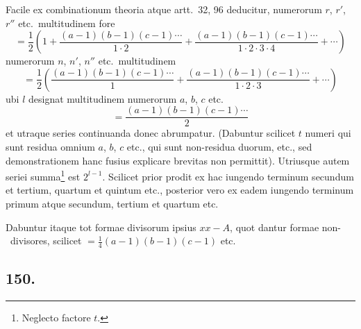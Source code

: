 \documentclass[12pt,a4paper]{article}
\theoremstyle{plain}
\theoremstyle{definition}
\theoremstyle{remark}
\begin{document}
Facile ex combinationum theoria atque artt.~32, 96 deducitur, numerorum
$r$, $r'$, $r''$ etc.\ multitudinem fore
\[
= \frac{1}{2}(1 + \frac{(a-1)(b-1)(c-1)\cdots}{1\cdot 2} + \frac{(a-1)(b-1)(c-1)\cdots}{1\cdot 2\cdot 3\cdot 4} + \cdots)
\]
numerorum $n$, $n'$, $n''$ etc.\ multitudinem
\[
= \frac{1}{2}(\frac{(a-1)(b-1)(c-1)\cdots}{1} + \frac{(a-1)(b-1)(c-1)\cdots}{1\cdot 2\cdot 3} + \cdots)
\]
ubi $l$ designat multitudinem numerorum $a$, $b$, $c$ etc.
\[
= \frac{(a-1)(b-1)(c-1)\cdots}{2}
\]
et utraque series continuanda donec abrumpatur. (Dabuntur scilicet $t$ numeri
qui sunt residua omnium $a$, $b$, $c$ etc., qui sunt non-residua duorum, etc.,
sed demonstrationem hanc fusius explicare brevitas non permittit). Utriusque
autem seriei summa\footnote{Neglecto factore $t$.} est $2^{l-1}$. Scilicet prior prodit ex hac
iungendo terminum secundum et tertium, quartum et quintum etc., posterior vero
ex eadem iungendo terminum primum atque secundum, tertium et quartum etc.

Dabuntur itaque tot formae divisorum ipsius $xx - A$, quot dantur formae non-\ divisores, scilicet $= \frac{1}{4}(a-1)(b-1)(c-1)$ etc.

\subsection*{150.}
\end{document}

